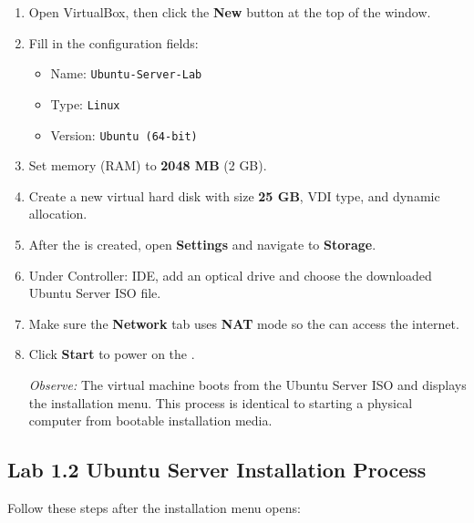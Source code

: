 \begin{enumerate}
    \item Open VirtualBox, then click the \textbf{New} button at the top of the window.
    \item Fill in the configuration fields:
    \begin{itemize}
        \item Name: \texttt{Ubuntu-Server-Lab}
        \item Type: \texttt{Linux}
        \item Version: \texttt{Ubuntu (64-bit)}
    \end{itemize}
    \item Set memory (RAM) to \textbf{2048 MB} (2 GB).
    \item Create a new virtual hard disk with size \textbf{25 GB}, VDI type, and dynamic allocation.
    \item After the  is created, open \textbf{Settings} and navigate to \textbf{Storage}.
    \item Under Controller: IDE, add an optical drive and choose the downloaded Ubuntu Server ISO file.
    \item Make sure the \textbf{Network} tab uses \textbf{NAT} mode so the  can access the internet.
    \item Click \textbf{Start} to power on the .

    \textit{Observe:} The virtual machine boots from the Ubuntu Server ISO and displays the installation menu. This process is identical to starting a physical computer from bootable installation media.
\end{enumerate}

\subsection*{Lab 1.2 Ubuntu Server Installation Process}

Follow these steps after the installation menu opens:

